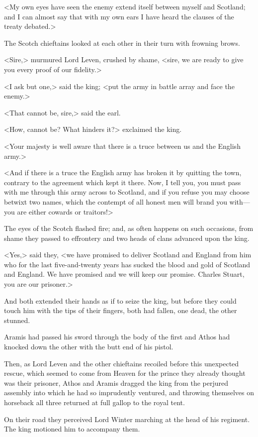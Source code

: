 <My own eyes have seen the enemy extend itself between myself and Scotland; and I can almost say that with my own ears I have heard the clauses of the treaty debated.>

The Scotch chieftains looked at each other in their turn with frowning brows.

<Sire,> murmured Lord Leven, crushed by shame, <sire, we are ready to give you every proof of our fidelity.>

<I ask but one,> said the king; <put the army in battle array and face the enemy.>

<That cannot be, sire,> said the earl.

<How, cannot be? What hinders it?> exclaimed the king.

<Your majesty is well aware that there is a truce between us and the English army.>

<And if there is a truce the English army has broken it by quitting the town, contrary to the agreement which kept it there. Now, I tell you, you must pass with me through this army across to Scotland, and if you refuse you may choose betwixt two names, which the contempt of all honest men will brand you with—you are either cowards or traitors!>

The eyes of the Scotch flashed fire; and, as often happens on such occasions, from shame they passed to effrontery and two heads of clans advanced upon the king.

<Yes,> said they, <we have promised to deliver Scotland and England from him who for the last five-and-twenty years has sucked the blood and gold of Scotland and England. We have promised and we will keep our promise. Charles Stuart, you are our prisoner.>

And both extended their hands as if to seize the king, but before they could touch him with the tips of their fingers, both had fallen, one dead, the other stunned.

Aramis had passed his sword through the body of the first and Athos had knocked down the other with the butt end of his pistol.

Then, as Lord Leven and the other chieftains recoiled before this unexpected rescue, which seemed to come from Heaven for the prince they already thought was their prisoner, Athos and Aramis dragged the king from the perjured assembly into which he had so imprudently ventured, and throwing themselves on horseback all three returned at full gallop to the royal tent.

On their road they perceived Lord Winter marching at the head of his regiment. The king motioned him to accompany them. 